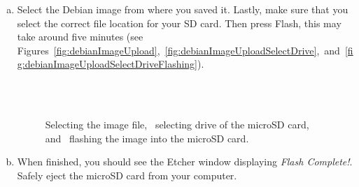 \begin{enumerate}[a)]
\item Select the Debian image from where you saved it. Lastly, make sure that you select the correct file location for your SD card. Then press Flash, this may take  around five minutes (see Figures~\ref{fig:debianImageUpload},~\ref{fig:debianImageUploadSelectDrive},~and~\ref{fig:debianImageUploadSelectDriveFlashing}). 
%
\begin{figure}
    \centering
    \\
    \\
    \caption{ Selecting the image file,~ selecting drive of the microSD card, and~ flashing the image into the microSD card.}
    \label{fig:debianImageUpload2-MicroSD}
\end{figure}
%


\item When finished, you should see the Etcher window displaying \emph{Flash Complete!}. Safely eject the microSD card from your computer.
\end{enumerate}


